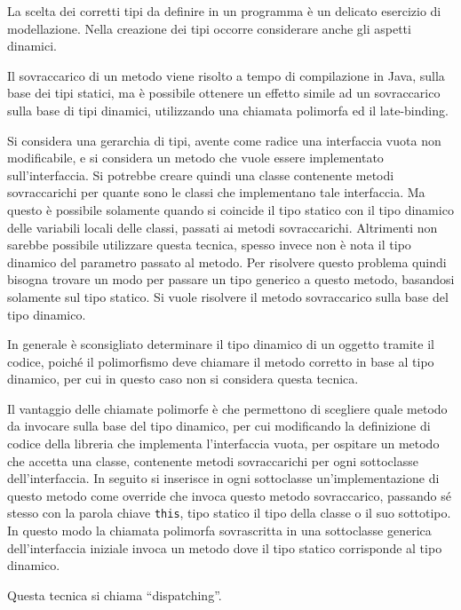 \documentclass{article}
\numberwithin{equation}{subsection}
\begin{document}
La scelta dei corretti tipi da definire in un programma è un delicato esercizio di modellazione. Nella creazione dei tipi occorre considerare anche gli aspetti dinamici. 


Il sovraccarico di un metodo viene risolto a tempo di compilazione in Java, sulla base dei tipi statici, ma è possibile ottenere un effetto simile ad un sovraccarico sulla base 
di tipi dinamici, utilizzando una chiamata polimorfa ed il late-binding. 

Si considera una gerarchia di tipi, avente come radice una interfaccia vuota non modificabile, e si considera un metodo che vuole essere implementato sull'interfaccia. 
Si potrebbe creare quindi una classe contenente metodi sovraccarichi per quante sono le classi che implementano tale interfaccia. Ma questo è possibile solamente quando si 
coincide il tipo statico con il tipo dinamico delle variabili locali delle classi, passati ai metodi sovraccarichi. Altrimenti non sarebbe possibile utilizzare questa tecnica, 
spesso invece non è nota il tipo dinamico del parametro passato al metodo. 
Per risolvere questo problema quindi bisogna trovare un modo per passare un tipo generico a questo metodo, basandosi solamente sul tipo statico. Si vuole risolvere il metodo 
sovraccarico sulla base del tipo dinamico.  

In generale è sconsigliato determinare il tipo dinamico di un oggetto tramite il codice, poiché il polimorfismo deve chiamare il metodo corretto in base al tipo dinamico, per 
cui in questo caso non si considera questa tecnica. 

Il vantaggio delle chiamate polimorfe è che permettono di scegliere quale metodo da invocare sulla base del tipo dinamico, per cui modificando la definizione di codice della 
libreria che implementa l'interfaccia vuota, per ospitare un metodo che accetta una classe, contenente metodi sovraccarichi per ogni sottoclasse dell'interfaccia. 
In seguito si inserisce in ogni sottoclasse un'implementazione di questo metodo come override che invoca questo metodo sovraccarico, passando sé stesso con la parola chiave 
\verb|this|, tipo statico il tipo della classe o il suo sottotipo. In questo modo la chiamata polimorfa sovrascritta in una sottoclasse generica dell'interfaccia iniziale 
invoca un metodo dove il tipo statico corrisponde al tipo dinamico. 


Questa tecnica si chiama ``dispatching''. 
\end{document}
